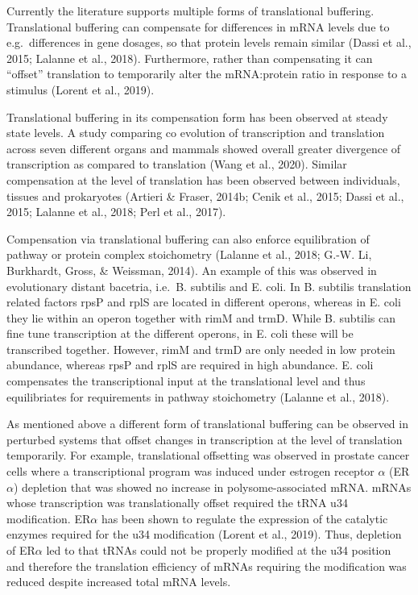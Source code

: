 \documentclass[
  12pt,
  openany]{book}
\begin{document}
Currently the literature supports multiple forms of translational buffering. Translational buffering can compensate for differences in mRNA levels due to e.g.~differences in gene dosages, so that protein levels remain similar (Dassi et al., 2015; Lalanne et al., 2018). Furthermore, rather than compensating it can ``offset'' translation to temporarily alter the mRNA:protein ratio in response to a stimulus (Lorent et al., 2019).

Translational buffering in its compensation form has been observed at steady state levels. A study comparing co evolution of transcription and translation across seven different organs and mammals showed overall greater divergence of transcription as compared to translation (Wang et al., 2020). Similar compensation at the level of translation has been observed between individuals, tissues and prokaryotes (Artieri \& Fraser, 2014b; Cenik et al., 2015; Dassi et al., 2015; Lalanne et al., 2018; Perl et al., 2017).

Compensation via translational buffering can also enforce equilibration of pathway or protein complex stoichometry (Lalanne et al., 2018; G.-W. Li, Burkhardt, Gross, \& Weissman, 2014). An example of this was observed in evolutionary distant bacetria, i.e.~B. subtilis and E. coli. In B. subtilis translation related factors rpsP and rplS are located in different operons, whereas in E. coli they lie within an operon together with rimM and trmD. While B. subtilis can fine tune transcription at the different operons, in E. coli these will be transcribed together. However, rimM and trmD are only needed in low protein abundance, whereas rpsP and rplS are required in high abundance. E. coli compensates the transcriptional input at the translational level and thus equilibriates for requirements in pathway stoichometry (Lalanne et al., 2018).

As mentioned above a different form of translational buffering can be observed in perturbed systems that offset changes in transcription at the level of translation temporarily. For example, translational offsetting was observed in prostate cancer cells where a transcriptional program was induced under estrogen receptor \(\alpha\) (ER\(\alpha\)) depletion that was showed no increase in polysome-associated mRNA. mRNAs whose transcription was translationally offset required the tRNA u34 modification. ER\(\alpha\) has been shown to regulate the expression of the catalytic enzymes required for the u34 modification (Lorent et al., 2019). Thus, depletion of ER\(\alpha\) led to that tRNAs could not be properly modified at the u34 position and therefore the translation efficiency of mRNAs requiring the modification was reduced despite increased total mRNA levels.
\newline
\end{document}
